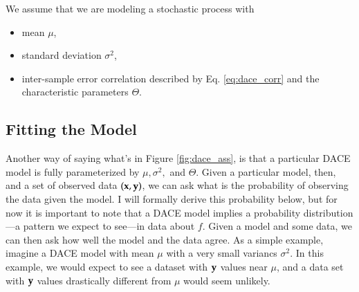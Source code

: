 \begin{minipage}{\textwidth}
\begin{framed}
We assume that we are modeling a stochastic process with
\begin{itemize}
\item mean $\mu$,
\item standard deviation $\sigma^2$,
\item inter-sample error correlation described by Eq. \ref{eq:dace_corr} and the characteristic parameters $\Theta$.
\end{itemize}

\end{framed}
\label{fig:dace_ass}
\end{minipage}




\subsection{Fitting the Model}\label{sec:max_lik}
Another way of saying what's in Figure \ref{fig:dace_ass}, is that a particular DACE model is fully parameterized by $\mu, \sigma^2,$ and $\Theta$. Given a particular model, then, and a set of observed data $(\mathbf{x},\mathbf{y})$, we can ask what is the probability of observing the data given the model. I will formally derive this probability below, but for now it is important to note that a DACE model implies a probability distribution---a pattern we expect to see---in data about $f$. Given a model and some data, we can then ask how well the model and the data agree. As a simple example, imagine a DACE model with mean $\mu$ with a very small variancs $\sigma^2$. In this example, we would expect to see a dataset with $\mathbf{y}$ values near $\mu$, and a data set with $\mathbf{y}$ values drastically different from $\mu$ would seem unlikely. 

